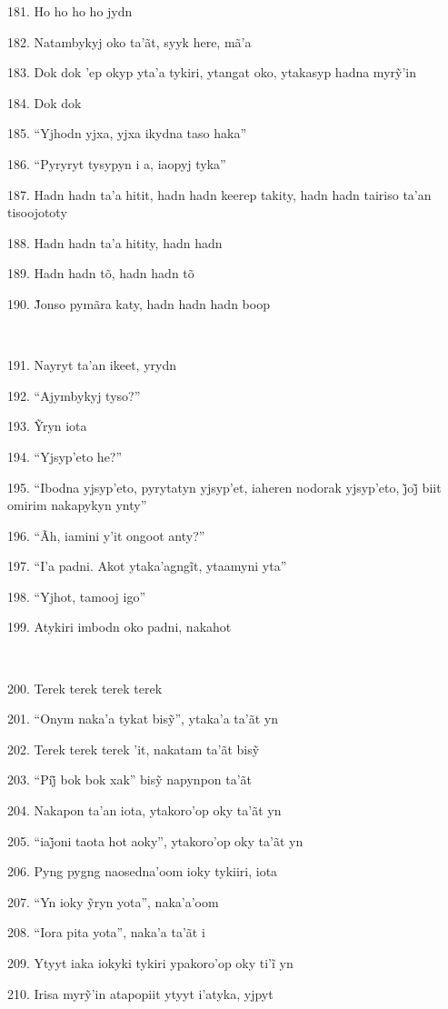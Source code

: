 181. Ho ho ho ho jydn

182. Natambykyj oko ta'ãt, syyk here, mã'a

183. Dok dok ’ep okyp yta’a tykiri, ytangat oko, ytakasyp hadna myrỹ’in

184. Dok dok

185. ``Yjhodn yjxa, yjxa ikydna taso haka''

186. ``Pyryryt tysypyn i a, iaopyj tyka''

187. Hadn hadn ta'a hitit, hadn hadn keerep takity, hadn hadn tairiso
ta'an tisoojototy

188. Hadn hadn ta'a hitity, hadn hadn

189. Hadn hadn tõ, hadn hadn tõ

190. J̃onso pymãra katy, hadn hadn hadn boop

~

191. Nayryt ta'an ikeet, yrydn

192. ``Ajymbykyj tyso?''

193. Ỹryn iota

194. ``Yjsyp'eto he?''

195. “Ibodna yjsyp’eto, pyrytatyn yjsyp’et, iaheren nodorak yjsyp’eto, j̃oj̃ biit omirim nakapykyn ynty”

196. ``Ãh, iamini y'it ongoot anty?''

197. “I’a padni. Akot ytaka’agngĩt, ytaamyni yta”

198. ``Yjhot, tamooj igo''

199. Atykiri imbodn oko padni, nakahot

~

200. Terek terek terek terek

201. “Onym naka’a tykat bisỹ”, ytaka’a ta’ãt yn

202. Terek terek terek ’it, nakatam ta’ãt bisỹ

203. “Pij̃ bok bok xak” bisỹ napynpon ta’ãt

204. Nakapon ta'an iota, ytakoro'op oky ta'ãt yn

205. “iaj̃oni taota hot aoky”, ytakoro’op oky ta’ãt yn

206. Pyng pygng naosedna'oom ioky tykiiri, iota

207. “Yn ioky ỹryn yota”, naka’a’oom

208. ``Iora pita yota'', naka'a ta'ãt i

209. Ytyyt iaka iokyki tykiri ypakoro’op oky ti’ĩ yn

210. Irisa myrỹ’in atapopiit ytyyt i’atyka, yjpyt

